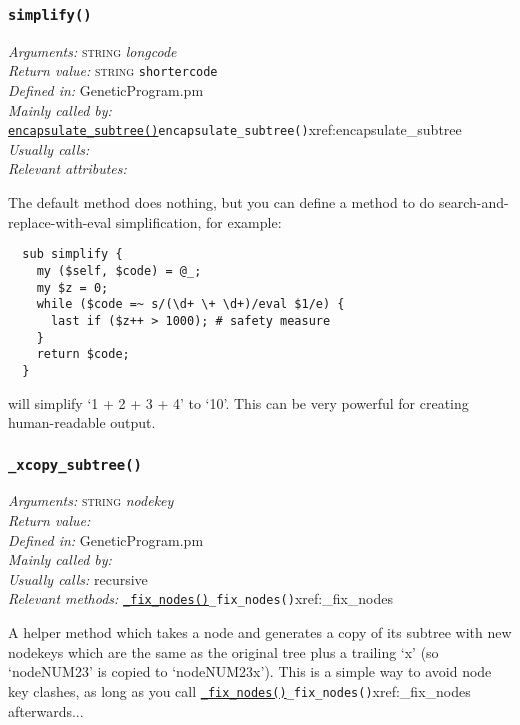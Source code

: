 \documentclass[a4paper]{article}
\begin{document}
\subsubsection{\texttt{simplify()}}\label{xref:simplify}
\begin{flushleft}
\textit{Arguments:} \textsc{string} \textit{longcode}\\
\textit{Return value:} \textsc{string} \texttt{shortercode}\\
\textit{Defined in:} GeneticProgram.pm\\
\textit{Mainly called by:} \hyperref[no]{\texttt{encapsulate\_subtree()}}{\texttt{encapsulate\_subtree()}}{xref:encapsulate_subtree}\\
\textit{Usually calls:} \\
\textit{Relevant attributes:}
\end{flushleft}

The default method does nothing, but you can define a method to do
search-and-replace-with-eval simplification, for example:

\begin{verbatim}
  sub simplify {
    my ($self, $code) = @_;
    my $z = 0;
    while ($code =~ s/(\d+ \+ \d+)/eval $1/e) {
      last if ($z++ > 1000); # safety measure
    }
    return $code;
  }
\end{verbatim}%

\noindent will simplify `1 + 2 + 3 + 4' to `10'.  This can be very
powerful for creating human-readable output.


\subsubsection{\texttt{\_xcopy\_subtree()}}\label{xref:_xcopy_subtree}
\begin{flushleft}
\textit{Arguments:} \textsc{string} \textit{nodekey}\\
\textit{Return value:} \\
\textit{Defined in:} GeneticProgram.pm\\
\textit{Mainly called by:} \\
\textit{Usually calls:} recursive\\
\textit{Relevant methods:} \hyperref[no]{\texttt{\_fix\_nodes()}}{\texttt{\_fix\_nodes()}}{xref:_fix_nodes}
\end{flushleft}

A helper method which takes a node and generates a copy of its subtree
with new nodekeys which are the same as the original tree plus a
trailing `x' (so `nodeNUM23' is copied to `nodeNUM23x').  This is a
simple way to avoid node key clashes, as long as you call
\hyperref[no]{\texttt{\_fix\_nodes()}}{\texttt{\_fix\_nodes()}}{xref:_fix_nodes} afterwards...
\end{document}
